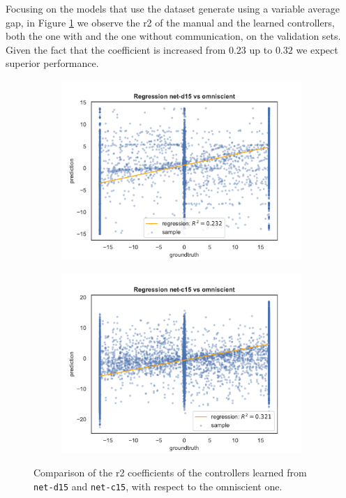 Focusing on the models that use the dataset generate using a variable average 
gap, in Figure \ref{fig:net-c15r2} we observe the \gls{r2} of the manual and the 
learned controllers, both the one with and the one without communication, on 
the validation sets.
Given the fact that the coefficient is increased from $0.23$ up to $0.32$ we 
expect superior performance.  
\begin{figure}[!htb]
	\begin{center}
		\begin{subfigure}[h]{0.49\textwidth}
			\includegraphics[width=\textwidth]{contents/images/net-d15/regression-net-d15-vs-omniscient}%
		\end{subfigure}
		\hfill\vspace{-0.5cm}
		\begin{subfigure}[h]{0.49\textwidth}
			\includegraphics[width=\textwidth]{contents/images/net-c15/regression-net-c15-vs-omniscient}%
		\end{subfigure}
	\end{center}
	\caption[Evaluation of the \gls{r2} coefficients of \texttt{net-c15}.]{Comparison 
		of the \gls{r2} coefficients of the controllers learned from 
		\texttt{net-d15} and \texttt{net-c15}, with respect to the omniscient one.}
	\label{fig:net-c15r2}
\end{figure}

